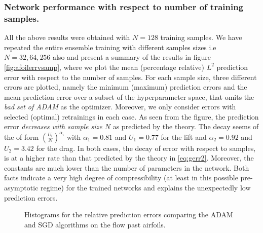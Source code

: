 \documentclass[a4paper]{article}
\numberwithin{equation}{section}
\numberwithin{equation}{section}
\theoremstyle{definition}
\theoremstyle{myremarkstyle}
\begin{document}
\subsubsection{Network performance with respect to number of training samples.}
 All the above results were obtained with $N=128$ training samples. We have repeated the entire ensemble training with different samples sizes i.e $N=32,64,256$ also and present a summary of the results in figure \ref{fig:afoilerrvsamp}, where we plot the mean (percentage relative) $L^2$ prediction error with respect to the number of samples. For each sample size, three different errors are plotted, namely the minimum (maximum) prediction errors and the mean prediction error over a subset of the hyperparameter space, that omits the \emph{bad set of ADAM} as the optimizer. Moreover, we only consider errors with selected (optimal) retrainings in each case. As seen from the figure, the prediction error \emph{decreases with sample size $N$} as predicted by the theory. The decay seems of the of form $\left(\frac{U_i}{N}\right)^{\alpha_i}$ with $\alpha_1=0.81$ and $U_1 = 0.77$ for the lift and $\alpha_2 = 0.92$ and $U_2 = 3.42$ for the drag. In both cases, the decay of error with respect to samples, is at a higher rate than that predicted by the theory in \eqref{eq:gerr2}. Moreover, the constants are much lower than the number of parameters in the network. Both facts indicate a very high degree of compressibility (at least in this possible pre-asymptotic regime) for the trained networks and explains the unexpectedly low prediction errors. 
\begin{figure}[htbp]
\caption{Histograms for the relative prediction errors comparing the ADAM and SGD algorithms on the flow past airfoils.}
\label{fig:afoilOpt}
\end{figure}
\end{document}
